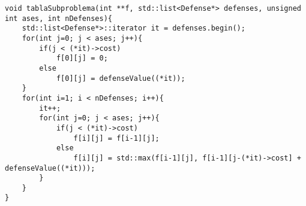 \begin{lstlisting}
void tablaSubproblema(int **f, std::list<Defense*> defenses, unsigned int ases, int nDefenses){
    std::list<Defense*>::iterator it = defenses.begin();
    for(int j=0; j < ases; j++){
        if(j < (*it)->cost)
            f[0][j] = 0;
        else
            f[0][j] = defenseValue((*it));
    }
    for(int i=1; i < nDefenses; i++){
        it++;
        for(int j=0; j < ases; j++){
            if(j < (*it)->cost)
                f[i][j] = f[i-1][j];
            else    
                f[i][j] = std::max(f[i-1][j], f[i-1][j-(*it)->cost] + defenseValue((*it)));
        }
    }
}
\end{lstlisting}
